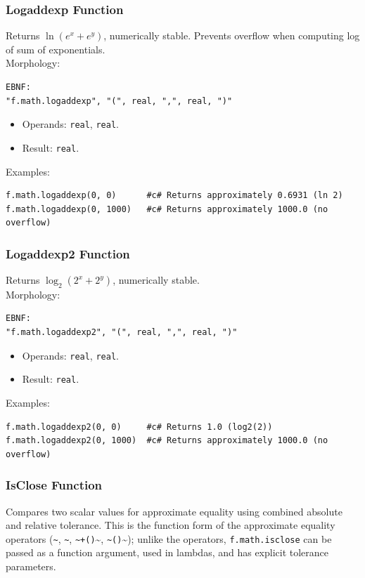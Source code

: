\subsubsection{Logaddexp Function}
Returns $\ln(e^x + e^y)$, numerically stable. Prevents overflow when computing log of sum of exponentials.\\
Morphology:
\begin{verbatim}
EBNF:
"f.math.logaddexp", "(", real, ",", real, ")"
\end{verbatim}
\begin{itemize}
\item Operands: \texttt{real}, \texttt{real}.
\item Result: \texttt{real}.
\end{itemize}
Examples:
\begin{verbatim}
f.math.logaddexp(0, 0)      #c# Returns approximately 0.6931 (ln 2)
f.math.logaddexp(0, 1000)   #c# Returns approximately 1000.0 (no overflow)
\end{verbatim}

\subsubsection{Logaddexp2 Function}
Returns $\log_2(2^x + 2^y)$, numerically stable.\\
Morphology:
\begin{verbatim}
EBNF:
"f.math.logaddexp2", "(", real, ",", real, ")"
\end{verbatim}
\begin{itemize}
\item Operands: \texttt{real}, \texttt{real}.
\item Result: \texttt{real}.
\end{itemize}
Examples:
\begin{verbatim}
f.math.logaddexp2(0, 0)     #c# Returns 1.0 (log2(2))
f.math.logaddexp2(0, 1000)  #c# Returns approximately 1000.0 (no overflow)
\end{verbatim}

\subsubsection{IsClose Function}
\label{sec:isclose}
Compares two scalar values for approximate equality using combined absolute and relative tolerance. This is the function form of the approximate equality operators (\texttt{\textasciitilde}, \texttt{\textasciitilde*}, \texttt{\textasciitilde+()}\textasciitilde, \texttt{\textasciitilde*()}\textasciitilde); unlike the operators, \texttt{f.math.isclose} can be passed as a function argument, used in lambdas, and has explicit tolerance parameters.

